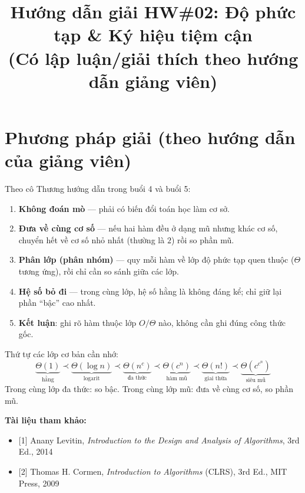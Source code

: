 \documentclass[12pt,a4paper]{article}
\title{\textbf{Hướng dẫn giải HW\#02: Độ phức tạp \& Ký hiệu tiệm cận}\\[6pt]
\large (Có lập luận/giải thích theo hướng dẫn giảng viên)}
\author{}
\date{}
\begin{document}
\maketitle
\thispagestyle{fancy}

\section*{Phương pháp giải (theo hướng dẫn của giảng viên)}

Theo cô Thương hướng dẫn trong buổi 4 và buổi 5:

\begin{enumerate}[label=\textbf{(\arabic*)}]
  \item \textbf{Không đoán mò} --- phải có biến đổi toán học làm cơ sở.
  \item \textbf{Đưa về cùng cơ số} --- nếu hai hàm đều ở dạng mũ nhưng khác cơ số, chuyển hết về cơ số nhỏ nhất (thường là $2$) rồi so phần mũ.
  \item \textbf{Phân lớp (phân nhóm)} --- quy mỗi hàm về lớp độ phức tạp quen thuộc ($\Theta$ tương ứng), rồi chỉ cần so sánh giữa các lớp.
  \item \textbf{Hệ số bỏ đi} --- trong cùng lớp, hệ số hằng là không đáng kể; chỉ giữ lại phần ``bậc'' cao nhất.
  \item \textbf{Kết luận}: ghi rõ hàm thuộc lớp $O/\Theta$ nào, không cần ghi đúng công thức gốc.
\end{enumerate}

\begin{notebox}
Thứ tự các lớp cơ bản cần nhớ:
\[
  \underbrace{\Theta(1)}_{\text{hằng}} \prec
  \underbrace{\Theta(\log n)}_{\text{logarit}} \prec
  \underbrace{\Theta(n^c)}_{\text{đa thức}} \prec
  \underbrace{\Theta(c^n)}_{\text{hàm mũ}} \prec
  \underbrace{\Theta(n!)}_{\text{giai thừa}} \prec
  \underbrace{\Theta(c^{c^n})}_{\text{siêu mũ}}
\]
Trong cùng lớp đa thức: so bậc. Trong cùng lớp mũ: đưa về cùng cơ số, so phần mũ.
\end{notebox}

\bigskip

\textbf{Tài liệu tham khảo:}
\begin{itemize}[noitemsep]
  \item {[1]} Anany Levitin, \textit{Introduction to the Design and Analysis of Algorithms}, 3rd Ed., 2014
  \item {[2]} Thomas H. Cormen, \textit{Introduction to Algorithms} (CLRS), 3rd Ed., MIT Press, 2009
\end{itemize}
\end{document}
